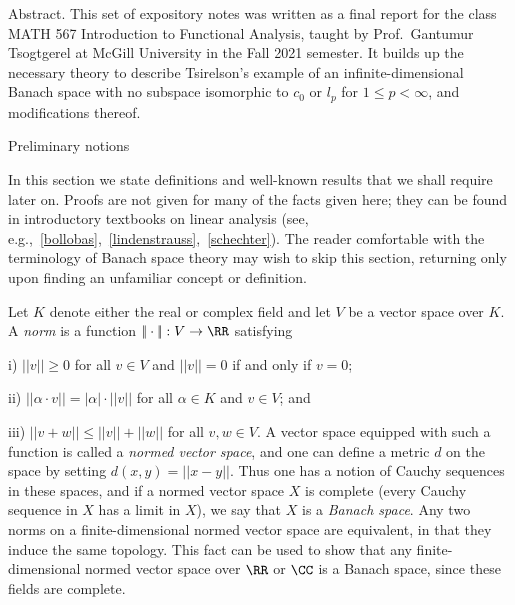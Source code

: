 






\def\norm#1{|\!|#1|\!|}
\def\threenorm#1{|\!|\!|#1|\!|\!|}
\def\bignorm#1{\big|\!\big|#1\big|\!\big|}
\def\Norm#1{\Big|\!\Big|#1\Big|\!\Big|}
\def\normm#1{\bigg|\!\bigg|#1\bigg|\!\bigg|}
\def\B{{\cal B}}
\def\supp{\op{supp}}

\widemargins
{}


 \ninebf Abstract.
\ninepoint
This set of expository notes was
written as a final report for the class MATH 567 Introduction to Functional Analysis,
taught by Prof.~Gantumur Tsogtgerel at McGill University in the Fall 2021 semester.
It builds up the necessary theory to describe Tsirelson's example of an infinite-dimensional
Banach space with no subspace isomorphic to $c_0$ or $l_p$ for $1\le p<\infty$, and
modifications thereof.

\advsect Preliminary notions

In this section we state definitions and well-known results that we shall require later on.
Proofs are not given for many of the facts given here; they can be found in introductory textbooks on
linear analysis (see, e.g.,~\ref{bollobas},~\ref{lindenstrauss},~\ref{schechter}).
The reader comfortable with the terminology of Banach space theory
may wish to skip this section, returning only upon finding an unfamiliar concept or definition.

Let $K$ denote either the real or complex field and let $V$ be a vector space over $K$. A
{\it norm} is a function $\norm{\cdot}:V\to\RR$ satisfying
\medskip
\item{i)} $\norm v \ge 0$ for all $v\in V$ and $\norm v = 0$ if and only if $v = 0$;
\smallskip
\item{ii)} $\norm{\alpha \cdot v} = |\alpha|\cdot\norm v$ for all $\alpha\in K$ and $v\in V$; and
\smallskip
\item{iii)} $\norm{v+w}\le \norm v + \norm w$ for all $v,w\in V$.
\medskip
A vector space equipped with such a function is called a {\it normed vector space}, and one can
define a metric $d$ on the space by setting $d(x,y) = \norm{x-y}$. Thus one has a notion of
Cauchy sequences in these spaces, and if a normed vector space $X$ is complete
(every Cauchy sequence in $X$ has a limit in $X$), we say that $X$ is a {\it Banach space}.
Any two norms on a finite-dimensional normed vector space are equivalent, in that they induce the
same topology. This fact can be used to show that any finite-dimensional normed vector space over
$\RR$ or $\CC$ is a Banach space, since these fields are complete.

